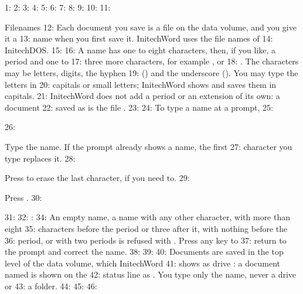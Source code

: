 1: %
2: %
3: %
4: %
5: %
6: %
7: %
8: %
9: %
10: 
11: \begin{Feature}{Filenames}
12: Each document you save is a file on the data volume, and you give it a
13: name when you first save it.  InitechWord uses the file names of
14: InitechDOS.
15: 
16: A name has one to eight characters, then, if you like, a period and one to
17: three more characters, for example ,  or
18: .  The characters may be letters, digits, the hyphen
19: (\Scr{-}) and the underscore (\Scr{\_}).  You may type the letters in
20: capitals or small letters; InitechWord shows and saves them in capitals.
21: InitechWord does not add a period or an extension of its own: a document
22: saved as  is the file .
23: 
24: To type a name at a prompt,
25: \begin{WPSteps}
26: \item Type the name.  If the prompt already shows a name, the first
27: character you type replaces it.
28: \item Press  to erase the last character, if you need to.
29: \item Press .
30: \end{WPSteps}
31: 
32: : 
34: An empty name, a name with any other character, with more than eight
35: characters before the period or three after it, with nothing before the
36: period, or with two periods is refused with .  Press any key to
37: return to the prompt and correct the name.
38: 
39: 
40: Documents are saved in the top level of the data volume, which InitechWord
41: shows as drive : a document named  is shown on the
42: status line as .  You type only the name, never a drive or
43: a folder.
44: 
45: 
46: \end{Feature}
